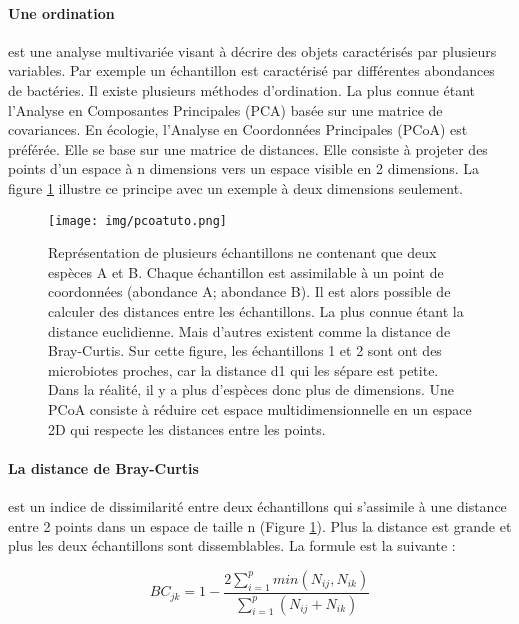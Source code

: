 \documentclass[12pt,a4paper]{article}
\begin{document}
\paragraph{Une ordination} est une analyse multivariée visant à décrire des objets caractérisés par plusieurs variables. Par exemple un échantillon est caractérisé par différentes abondances de bactéries. Il existe plusieurs méthodes d'ordination. La plus connue étant l'Analyse en Composantes Principales (PCA) basée sur une matrice de covariances. En écologie, l'Analyse en Coordonnées Principales (PCoA) est préférée. Elle se base sur une matrice de distances. Elle consiste à projeter des points d'un espace à n dimensions vers un espace visible en 2 dimensions.
La figure \ref{pcoatuto} illustre ce principe avec un exemple à deux dimensions seulement.

\begin{figure}[!h]
\begin{center}
\texttt{[image: img/pcoatuto.png]}\hfill
\end{center}
\caption{Représentation de plusieurs échantillons ne contenant que deux espèces A et B. Chaque échantillon est assimilable à un point de coordonnées (abondance A; abondance B). Il est alors possible de calculer des distances entre les échantillons. La plus connue étant la distance euclidienne. Mais d'autres existent comme la distance de Bray-Curtis. Sur cette figure, les échantillons 1 et 2 sont ont des microbiotes proches, car la distance d1 qui les sépare est petite. Dans la réalité, il y a plus d'espèces donc plus de dimensions. Une PCoA consiste à réduire cet espace multidimensionnelle en un espace 2D qui respecte les distances entre les points. }
\label{pcoatuto}
\end{figure}
\newpage

\paragraph{La distance de Bray-Curtis} est un indice de dissimilarité entre deux échantillons qui s'assimile à une distance entre 2 points dans un espace de taille n (Figure \ref{pcoatuto}). Plus la distance est grande et plus les deux échantillons sont dissemblables. La formule est la suivante :

\begin{mycapequ}[!h]
   \begin{equation}
    BC_{jk} = 1 - \frac{2\sum_{i=1}^{p}min(N_{ij},N_{ik})}{\sum_{i=1}^{p}(N_{ij} + N_{ik})}
   \end{equation}
      \caption{Où $N_{ij}$ est l'abondance d'une  espèce i dans l'échantillon j et $N_{ik}$ l'abondance de la même espèce i dans l'échantillon k. Le terme min(.,.) correspond au minimum obtenu pour deux comptes sur les mêmes échantillons. Les sommes situées au numérateur et dénominateur sont réalisés sur l'ensemble des espèces présentes dans les échantillons.}
\end{mycapequ}
\end{document}

